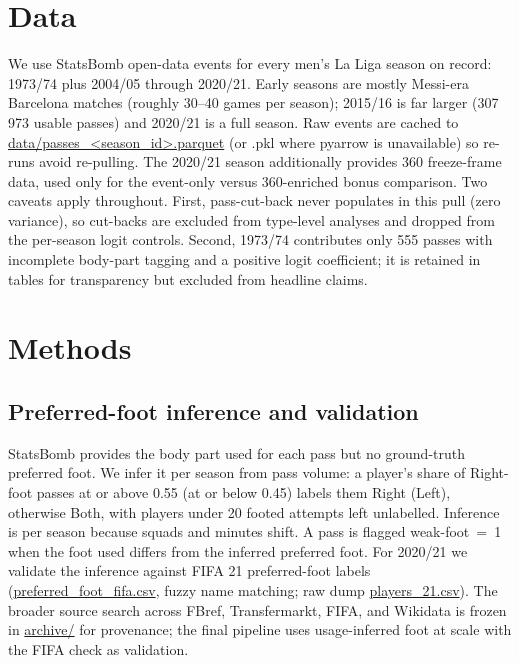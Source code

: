 \documentclass[11pt,a4paper]{article}
\begin{document}
\section{Data}
We use StatsBomb open-data events for every men's La Liga season on
record: 1973/74 plus 2004/05 through 2020/21. Early seasons are mostly
Messi-era Barcelona matches (roughly 30--40 games per season); 2015/16 is
far larger (307\,973 usable passes) and 2020/21 is a full season. Raw
events are cached to \url{data/passes_<season_id>.parquet} (or .pkl where pyarrow is
unavailable) so re-runs avoid re-pulling. The 2020/21 season additionally
provides 360 freeze-frame data, used only for the event-only versus
360-enriched bonus comparison. Two caveats apply throughout. First,
pass-cut-back never populates in this pull (zero variance), so
cut-backs are excluded from type-level analyses and dropped from the
per-season logit controls. Second, 1973/74 contributes only 555 passes
with incomplete body-part tagging and a positive logit coefficient; it is
retained in tables for transparency but excluded from headline claims.

\section{Methods}

\subsection{Preferred-foot inference and validation}
StatsBomb provides the body part used for each pass but no ground-truth
preferred foot. We infer it per season from pass volume: a player's share
of Right-foot passes at or above 0.55 (at or below 0.45) labels them Right
(Left), otherwise Both, with players under 20 footed attempts left
unlabelled. Inference is per season because squads and minutes shift. A
pass is flagged weak-foot~=~1 when the foot used differs from
the inferred preferred foot. For 2020/21 we validate the inference
against FIFA 21 preferred-foot labels
(\url{preferred_foot_fifa.csv}, fuzzy name matching; raw dump
\url{players_21.csv}). The broader source search across FBref,
Transfermarkt, FIFA, and Wikidata is frozen in \url{archive/} for
provenance; the final pipeline uses usage-inferred foot at scale with the
FIFA check as validation.
\end{document}
